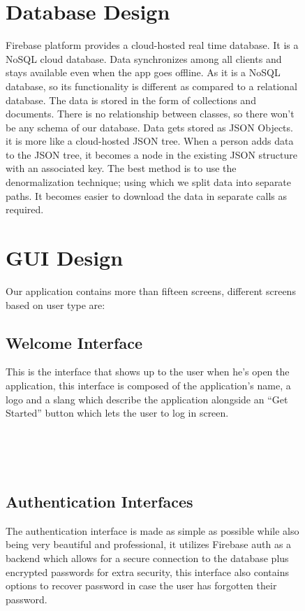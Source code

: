 \begin{figure}
\section{Database Design}
Firebase platform provides a cloud-hosted real time database. It is a NoSQL cloud database. Data synchronizes among all clients and stays available even when the app goes offline. As it is a NoSQL database, so its functionality is different as compared to a relational database. The data is stored in the form of collections and documents. There is no relationship between classes, so there won’t be any schema of our database. Data gets stored as JSON Objects. it is more like a cloud-hosted JSON tree. When a person adds data to the JSON tree, it becomes a node in the existing JSON structure with an associated key. The best method is to use the denormalization technique; using which we split data into separate paths. It becomes easier to download the data in separate calls as required.
\end{figure}

\begin{figure}
\section{GUI Design}
Our application contains more than fifteen screens, different screens based on user type are:
\end{figure}

\begin{figure}
\subsection{Welcome Interface}
This is the interface that shows up to the user when he’s open the application, this interface is composed of the application’s name, a logo and a slang which describe the application alongside an “Get Started” button which lets the user to log in screen.\\~\\
\begin{center}
\\~\\
\end{center}
\subsection{Authentication Interfaces}
The authentication interface is made as simple as possible while also being very beautiful and professional, it utilizes Firebase auth as a backend which allows for a secure connection to the database plus encrypted passwords for extra security, this interface also contains options to recover password in case the user has forgotten their password.

\end{figure}

